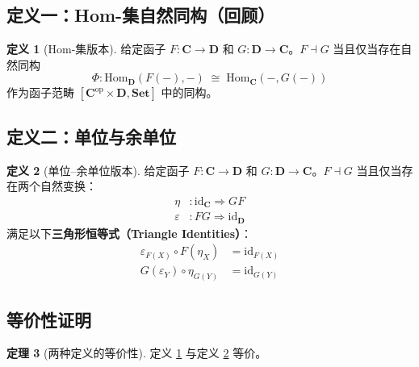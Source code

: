 \documentclass[12pt,a4paper]{ctexart}
\theoremstyle{definition}
\newtheorem{definition}{定义}[section]
\newtheorem{theorem}[definition]{定理}
\newcommand{\cat}[1]{\mathbf{#1}}
\newcommand{\Set}{\cat{Set}}
\newcommand{\id}{\mathrm{id}}
\newcommand{\Hom}{\mathrm{Hom}}
\newcommand{\dashvadj}{\dashv}
\begin{document}
\subsection{定义一：Hom-集自然同构（回顾）}

\begin{definition}[Hom-集版本]\label{def:adj-hom}
给定函子 $F: \cat{C} \to \cat{D}$ 和 $G: \cat{D} \to \cat{C}$。$F \dashvadj G$ 当且仅当存在自然同构
\[
\Phi: \Hom_{\cat{D}}(F(-), -) \;\cong\; \Hom_{\cat{C}}(-, G(-))
\]
作为函子范畴 $[\cat{C}^{\mathrm{op}} \times \cat{D}, \Set]$ 中的同构。
\end{definition}

\subsection{定义二：单位与余单位}

\begin{definition}[单位--余单位版本]\label{def:adj-unit}
给定函子 $F: \cat{C} \to \cat{D}$ 和 $G: \cat{D} \to \cat{C}$。$F \dashvadj G$ 当且仅当存在两个自然变换：
\begin{align}
\eta &: \id_{\cat{C}} \Longrightarrow GF \tag{单位/Unit}\\
\varepsilon &: FG \Longrightarrow \id_{\cat{D}} \tag{余单位/Counit}
\end{align}
满足以下\textbf{三角形恒等式（Triangle Identities）}：
\begin{align}
\varepsilon_{F(X)} \circ F(\eta_X) &= \id_{F(X)} \label{eq:tri1-comp}\\
G(\varepsilon_Y) \circ \eta_{G(Y)} &= \id_{G(Y)} \label{eq:tri2-comp}
\end{align}
\end{definition}

\subsection{等价性证明}

\begin{theorem}[两种定义的等价性]\label{thm:equiv}
定义 \ref{def:adj-hom} 与定义 \ref{def:adj-unit} 等价。
\end{theorem}
\end{document}
